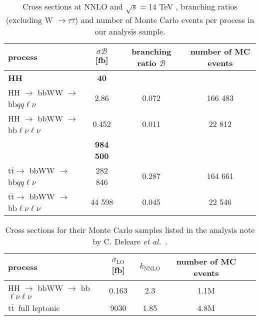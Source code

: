 \documentclass[10pt,a4paper]{article}
\renewcommand{\tt}{$\text{t}\bar{\text{t}}$}
\newcommand{\di}{$\rightarrow$ bbWW $\rightarrow$ bb$\ell\nu \ell\nu$}
\newcommand{\semi}{$\rightarrow$ bbWW $\rightarrow$ bb$qq\ell\nu$}
\newcommand{\sAN}{$\sigma_1$}
\newcommand{\BR}{\mathcal{B}}
\newcommand{\etal}{\emph{et al.}}
\begin{document}
\begin{table}[p]
	\centering
	\caption{Cross sections at NNLO and $\sqrt{s}=14$ TeV \cite{sigma_HH}\cite{sigma_tt}, branching ratios (excluding W $\rightarrow \tau\bar{\tau}$) \cite{BR_HH}\cite{BR_W} and number of Monte Carlo events per process in our analysis sample.} \vspace{5pt}
	\label{sigma}
	\begin{tabular}{@{}lccc@{}}
	\toprule
	process      & $\sigma\BR$ [fb] & branching ratio $\BR$ & number of MC events \\
	\midrule
	\textbf{HH}  & \textbf{40}      &           & \\ %
	HH \semi     &        2.86      &   0.072   &  166 483  \\
	HH \di       &        0.452     &   0.011   &   22 812  \\
	\bm{\tt}     & \textbf{984 500} &           & \\ %
	\tt \semi    &     282 846      &   0.287   &  164 661  \\
	\tt \di      &      44 598      &   0.045   &   22 546  \\
	\bottomrule
	\end{tabular}
\end{table}


\begin{table}[p]
	\centering
	\caption{Cross sections for their Monte Carlo samples listed in the analysis note by C. Deleare \etal\ \cite{AN}.} \vspace{5pt} %
	\label{sigma_AN}
	\begin{tabular}{@{}lcccc@{}}
	\toprule
	process            & $\sigma_\text{LO}$ [fb] & $k_\text{NNLO}$ & number of MC events \\
	\midrule
	HH \di             &  0.163  &   2.3   & 1.1M \\
	\tt\ full leptonic &  9030   &  1.85   & 4.8M \\
	\bottomrule
	\end{tabular}
\end{table}
\end{document}
